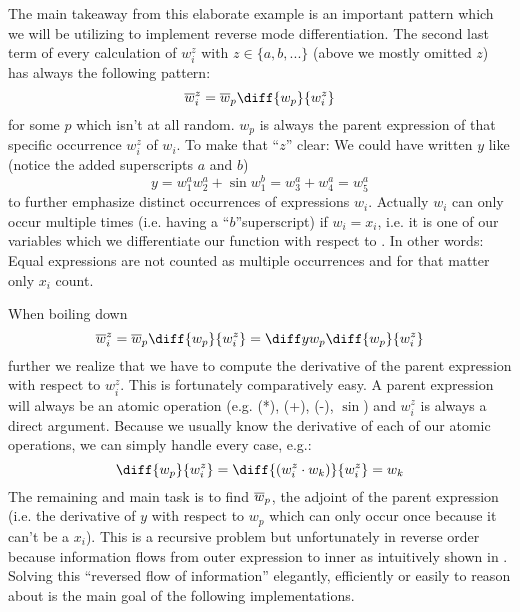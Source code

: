 The main takeaway from this elaborate \todowording example is an important pattern which we will be utilizing to implement reverse mode differentiation. The second last term of every calculation of $w_i^z$ with $z \in \{a, b, ...\}$ (above we mostly omitted $z$)  has always the following pattern:
\newcommand{\defoverwiz}{\overw{i}^z = \overw{p}\diff{w_p}{w_i^z}}
\[ \defoverwiz \]
for some $p$ which isn't at all random. $w_p$ is always the parent expression of that specific occurrence $w_i^z$ of $w_i$. To make that ``$z$'' clear: We could have written $y$ like (notice the added superscripts $a$ and $b$)
\[ y = w_1^a w_2^a + \sin{w_1^b} = w_3^a + w_4^a = w_5^a \]
to further emphasize distinct occurrences of expressions $w_i$. Actually $w_i$ can only occur multiple times (i.e. having a ``$b$''superscript) if $w_i = x_i$, i.e. it is one of our variables which we differentiate our function with respect to \todogrammar. In other words: Equal expressions are not counted as multiple occurrences and for that matter only $x_i$ count.

When boiling down
\[ \overw{i}^z = \overw{p}\diff{w_p}{w_i^z} = \diffyw{p}\diff{w_p}{w_i^z} \]
further we realize that we have to compute the derivative of the parent expression with respect to $w_i^z$. This is fortunately comparatively easy. A parent expression will always be an atomic operation (e.g. (*), (+), (-), $\sin$) and $w_i^z$ is always a direct argument. Because we usually know the derivative of each of our atomic operations, we can simply handle every case, e.g.:
\[ \diff{w_p}{w_i^z} = \diff{(w_i^z \cdot w_k)}{w_i^z} = w_k \]
The remaining and main task is to find $\overline{w}_p$, \todopunctuation the adjoint of the parent expression (i.e. the derivative of $y$ with respect to $w_p$ which can only occur once because it can't be a $x_i$). This is a recursive problem but unfortunately in reverse order because information flows from outer expression to inner  as intuitively shown in  . Solving this ``reversed flow of information'' elegantly, efficiently or easily to reason about is the main goal of the following implementations. 

